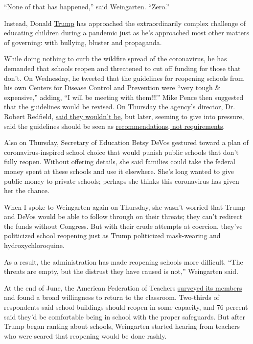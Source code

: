 ``None of that has happened,'' said Weingarten. ``Zero.''

Instead, Donald
\href{https://www.nytimes.com/2020/07/10/us/politics/trump-schools-reopening.html}{Trump}
has approached the extraordinarily complex challenge of educating
children during a pandemic just as he's approached most other matters of
governing: with bullying, bluster and propaganda.

While doing nothing to curb the wildfire spread of the coronavirus, he
has demanded that schools reopen and threatened to cut off funding for
those that don't. On Wednesday, he tweeted that the guidelines for
reopening schools from his own Centers for Disease Control and
Prevention were ``very tough \& expensive,'' adding, ``I will be meeting
with them!!!'' Mike Pence then suggested that the
\href{https://www.usatoday.com/story/news/politics/2020/07/08/pence-cdc-changing-coronavirus-school-guidelines-after-trump-attack/5398493002/}{guidelines
would be revised}. On Thursday the agency's director, Dr. Robert
Redfield,
\href{https://www.cnn.com/2020/07/09/politics/cdc-guidelines-school-reopenings/index.html}{said
they wouldn't be}, but later, seeming to give into pressure, said the
guidelines should be seen as
\href{https://news.yahoo.com/cdc-softens-guidelines-for-reopening-schools-after-trump-calls-them-impractical-and-expensive-181630718.html}{recommendations,
not requirements}.

Also on Thursday, Secretary of Education Betsy DeVos gestured toward a
plan of coronavirus-inspired school choice that would punish public
schools that don't fully reopen. Without offering details, she said
families could take the federal money spent at these schools and use it
elsewhere. She's long wanted to give public money to private schools;
perhaps she thinks this coronavirus has given her the chance.

When I spoke to Weingarten again on Thursday, she wasn't worried that
Trump and DeVos would be able to follow through on their threats; they
can't redirect the funds without Congress. But with their crude attempts
at coercion, they've politicized school reopening just as Trump
politicized mask-wearing and hydroxychloroquine.

As a result, the administration has made reopening schools more
difficult. ``The threats are empty, but the distrust they have caused is
not,'' Weingarten said.

At the end of June, the American Federation of Teachers
\href{https://www.aft.org/sites/default/files/june_2020_member_poll_slides_07072020.pdf}{surveyed
its members} and found a broad willingness to return to the classroom.
Two-thirds of respondents said school buildings should reopen in some
capacity, and 76 percent said they'd be comfortable being in school with
the proper safeguards. But after Trump began ranting about schools,
Weingarten started hearing from teachers who were scared that reopening
would be done rashly.

